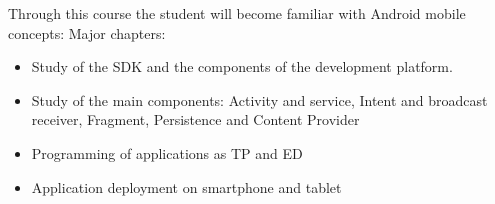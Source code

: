 Through this course the student will become familiar with Android mobile concepts:
Major chapters:
\begin{itemize}
    \item Study of the SDK and the components of the development platform.
    \item Study of the main components: Activity and service, Intent and broadcast receiver, Fragment, Persistence and Content Provider
    \item Programming of applications as TP and ED
    \item Application deployment on smartphone and tablet
\end{itemize}